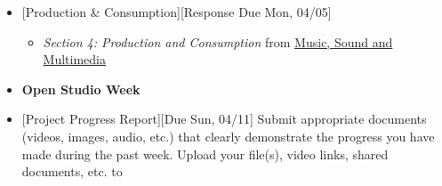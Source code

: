 \def\dMon{Mon, 04/05}
\def\dTues{Tues, 04/06}
\def\dWed{Wed, 04/07}
\def\dThur{Thur, 04/08}
\def\dFri{Fri, 04/09}
\def\dSat{Sat, 04/10}
\def\dSun{Sun, 04/11}
\placeDate

\begin{itemize}[noitemsep,topsep=0pt,leftmargin=*]
	\item {}[Production \& Consumption][Response Due \dMon]
	      \begin{itemize}
		      \item \emph{Section 4: Production and Consumption} from \href{supplements/Music_Sound_and_Multimedia_-_From_the_Live_to_the_Virtual_(Music_and_the_Moving_Image)_(2008).pdf}{Music, Sound and Multimedia}
	      \end{itemize}
	\item \textcolor{defaultColor}{\textbf{Open Studio Week}}
	\item {}[Project Progress Report][Due \dSun] \newline
	      Submit appropriate documents (videos, images, audio, etc.) that clearly demonstrate the progress you have made during the past week. Upload your file(s), video links, shared documents, etc. to \discordE
\end{itemize}
